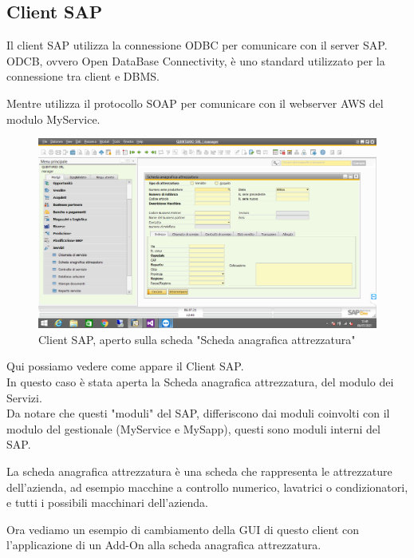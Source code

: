 \subsection{Client SAP}
\begin{flushleft}
	\item Il client SAP utilizza la connessione ODBC per comunicare con il server SAP.\\ODCB, ovvero Open DataBase Connectivity, è uno standard utilizzato per la connessione tra client e DBMS. 
	\item Mentre utilizza il protocollo SOAP per comunicare con il webserver AWS del modulo MyService.
\end{flushleft}
\begin{figure}[!h] 
	\centering 
	\includegraphics[scale = 0.4]{immagini/client-sap.png} 
	\caption {Client SAP, aperto sulla scheda "Scheda anagrafica attrezzatura"}
\end{figure}
\begin{flushleft}
	\item Qui possiamo vedere come appare il Client SAP.\\In questo caso è stata aperta la Scheda anagrafica attrezzatura, del modulo dei Servizi.\\Da notare che questi "moduli" del SAP, differiscono dai moduli coinvolti con il modulo del gestionale (MyService e MySapp), questi sono moduli interni del SAP.
	\item La scheda anagrafica attrezzatura è una scheda che rappresenta le attrezzature dell'azienda, ad esempio macchine a controllo numerico, lavatrici o condizionatori, e tutti i possibili macchinari dell'azienda.
	\item Ora vediamo un esempio di cambiamento della GUI di questo client con l'applicazione di un Add-On alla scheda anagrafica attrezzatura.
\end{flushleft}
